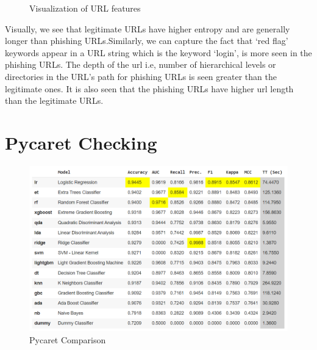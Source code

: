 \begin{figure}[H]
  \centering
  \hfill
  \caption{Visualization of URL features}
  \label{fig:bothfigures}
\end{figure}

\par Visually, we see that legitimate URLs have higher entropy and are generally longer than phishing URLs.Similarly, we can capture the fact that ‘red flag’ keywords appear in a URL string which is the keyword ‘login’, is more seen in the phishing URLs. The depth of the url i.e, number of hierarchical levels or directories in the URL’s path for phishing URLs is seen greater than the legitimate ones. It is also seen that the phishing URLs have higher url length than the legitimate URLs.

\section{Pycaret Checking}

\begin{figure}[H]
\centerline{\includegraphics[scale=0.6]{pycaretCheck.png}}
\caption{Pycaret Comparison}
\label{fig}
\end{figure}

